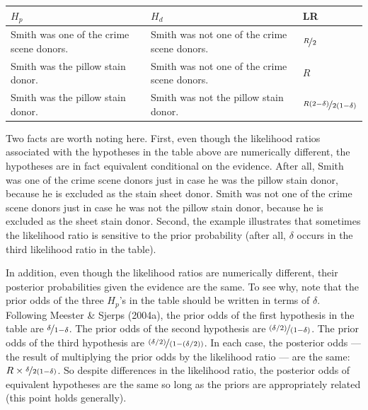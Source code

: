 \documentclass[10pt,dvipsnames,enabledeprecatedfontcommands]{scrartcl}
\begin{document}
\vspace{2mm}
\begin{center}
    \footnotesize
    \begin{tabular}{@{}p{5cm}p{5cm}l@{}}
        \toprule
        $H_p$ & $H_d$  & LR \\ \midrule
        Smith was one of the crime scene donors.   &  Smith was not one of the crime scene donors. & $\nicefrac{R}{2}$   \\
        Smith was the pillow stain donor.     & Smith was not one of the crime scene donors.& $R$\\
        Smith was the pillow stain donor. & Smith was not the pillow stain donor. &  $\nicefrac{R(2-\delta)}{2(1-\delta)}$
        \\ \bottomrule
    \end{tabular}
\end{center}
\normalsize
\vspace{2mm}

\noindent

Two facts are worth noting here. First, even though the likelihood
ratios associated with the hypotheses in the table above are numerically
different, the hypotheses are in fact equivalent conditional on the
evidence. After all, Smith was one of the crime scene donors just in
case he was the pillow stain donor, because he is excluded as the stain
sheet donor. Smith was not one of the crime scene donors just in case he
was not the pillow stain donor, because he is excluded as the sheet
stain donor. Second, the example illustrates that sometimes the
likelihood ratio is sensitive to the prior probability (after all,
\(\delta\) occurs in the third likelihood ratio in the table).

In addition, even though the likelihood ratios are numerically
different, their posterior probabilities given the evidence are the
same. To see why, note that the prior odds of the three \(H_p\)'s in the
table should be written in terms of \(\delta\). Following Meester \&
Sjerps (2004a), the prior odds of the first hypothesis in the table are
\(\nicefrac{\delta}{1-\delta}\). The prior odds of the second hypothesis
are \(\nicefrac{(\delta/2)}{(1-\delta)}\). The prior odds of the third
hypothesis are \(\nicefrac{(\delta/2)}{(1-(\delta/2))}\). In each case,
the posterior odds --- the result of multiplying the prior odds by the
likelihood ratio --- are the same:
\(R\times \nicefrac{\delta}{2(1-\delta)}\). So despite differences in
the likelihood ratio, the posterior odds of equivalent hypotheses are
the same so long as the priors are appropriately related (this point
holds generally).
\end{document}
